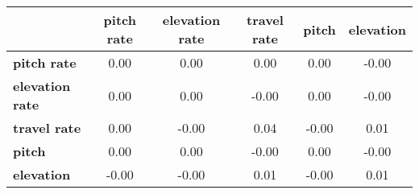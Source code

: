 \begin{tiny}\begin{tabular}{|l|c|c|c|c|c|}
\hline
&\textbf{pitch rate}&\textbf{elevation rate}&\textbf{travel rate}&\textbf{pitch}&\textbf{elevation}\\\hline
\textbf{pitch rate}&0.00&0.00&0.00&0.00&-0.00\\\hline
\textbf{elevation rate}&0.00&0.00&-0.00&0.00&-0.00\\\hline
\textbf{travel rate}&0.00&-0.00&0.04&-0.00&0.01\\\hline
\textbf{pitch}&0.00&0.00&-0.00&0.00&-0.00\\\hline
\textbf{elevation}&-0.00&-0.00&0.01&-0.00&0.01\\\hline
\end{tabular}
\end{tiny}
